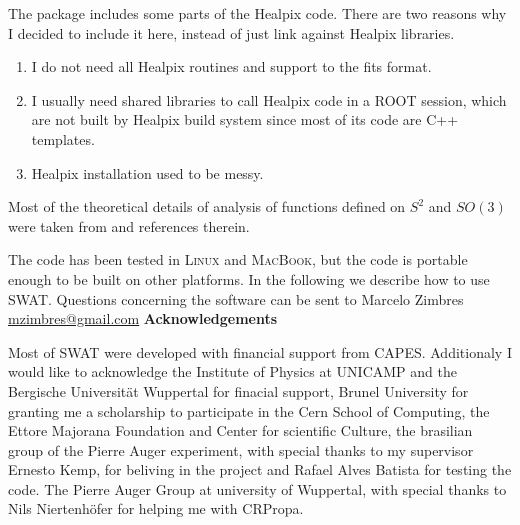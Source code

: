 \documentclass[12pt]{article}
\begin{document}
The package includes some parts of the Healpix code. There are two reasons why
I decided to include it here, instead of just link against Healpix libraries.
\begin{enumerate}
\item I do not need all Healpix routines and support to the fits format. 
\item I usually need shared libraries to call Healpix code in a ROOT session,
which are not built by Healpix build system since most of its code are C++
templates.
\item Healpix installation used to be messy.
\end{enumerate}

Most of the theoretical details of analysis of functions defined on $S^2$ and
$SO(3)$ were taken from \cite{wiaux} and references therein. 

The code has been tested in \textsc{Linux} and \textsc{MacBook}, but the code
is portable enough to be built on other platforms.  In the following we
describe how to use SWAT. Questions concerning the software can be sent to Marcelo
Zimbres \href{mailto:mzimbres@gmail.com}{mzimbres@gmail.com}
\vspace{0.7cm}
\newline
{\bf \large Acknowledgements}
\vspace{0.7cm}

Most of SWAT were developed with financial support from CAPES.  Additionaly I
would like to acknowledge the Institute of Physics at UNICAMP and the Bergische
Universit\"at Wuppertal for finacial support, Brunel University for granting me a
scholarship to participate in the Cern School of Computing, the Ettore Majorana
Foundation and Center for scientific Culture, the brasilian group of the Pierre
Auger experiment, with special thanks to my supervisor Ernesto Kemp, for
beliving in the project and Rafael Alves Batista for testing the code. The
Pierre Auger Group at university of Wuppertal, with special thanks to Nils
Niertenh\"ofer for helping me with CRPropa.
\end{document}
